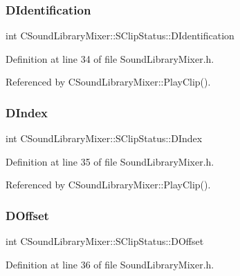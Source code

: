 \subsubsection{\texorpdfstring{D\+Identification}{DIdentification}}
{\footnotesize\ttfamily int C\+Sound\+Library\+Mixer\+::\+S\+Clip\+Status\+::\+D\+Identification}



Definition at line 34 of file Sound\+Library\+Mixer.\+h.



Referenced by C\+Sound\+Library\+Mixer\+::\+Play\+Clip().

\hypertarget{structCSoundLibraryMixer_1_1SClipStatus_a816de7bb8f6d975ec56008d56826050d}{}\label{structCSoundLibraryMixer_1_1SClipStatus_a816de7bb8f6d975ec56008d56826050d} 
\subsubsection{\texorpdfstring{D\+Index}{DIndex}}
{\footnotesize\ttfamily int C\+Sound\+Library\+Mixer\+::\+S\+Clip\+Status\+::\+D\+Index}



Definition at line 35 of file Sound\+Library\+Mixer.\+h.



Referenced by C\+Sound\+Library\+Mixer\+::\+Play\+Clip().

\hypertarget{structCSoundLibraryMixer_1_1SClipStatus_af1fd7d320df05e7ac19306352c02ffb6}{}\label{structCSoundLibraryMixer_1_1SClipStatus_af1fd7d320df05e7ac19306352c02ffb6} 
\subsubsection{\texorpdfstring{D\+Offset}{DOffset}}
{\footnotesize\ttfamily int C\+Sound\+Library\+Mixer\+::\+S\+Clip\+Status\+::\+D\+Offset}



Definition at line 36 of file Sound\+Library\+Mixer.\+h.



